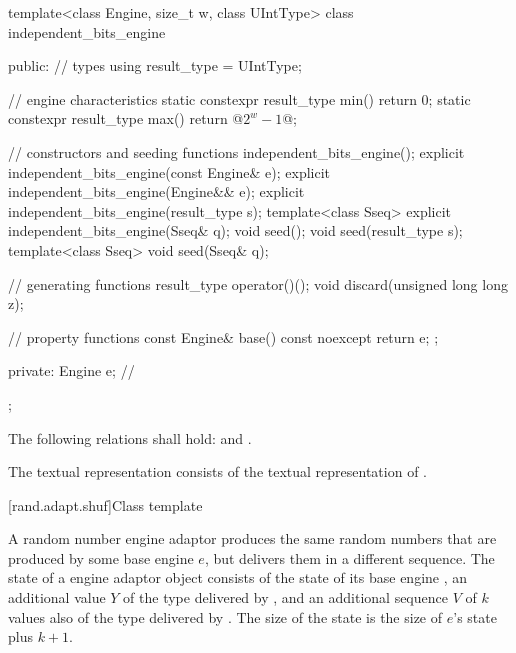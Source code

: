 \begin{codeblock}
template<class Engine, size_t w, class UIntType>
class independent_bits_engine
{
public:
 // types
 using result_type = UIntType;

 // engine characteristics
 static constexpr result_type min() { return 0; }
 static constexpr result_type max() { return @$2^w - 1$@; }

 // constructors and seeding functions
 independent_bits_engine();
 explicit independent_bits_engine(const Engine& e);
 explicit independent_bits_engine(Engine&& e);
 explicit independent_bits_engine(result_type s);
 template<class Sseq> explicit independent_bits_engine(Sseq& q);
 void seed();
 void seed(result_type s);
 template<class Sseq> void seed(Sseq& q);

 // generating functions
 result_type operator()();
 void discard(unsigned long long z);

 // property functions
 const Engine& base() const noexcept { return e; };

private:
 Engine e;   // \expos
};
\end{codeblock}%

\pnum
The following relations shall hold:
and
  .

\pnum
The textual representation%
%
consists of
 the textual representation of .



[rand.adapt.shuf]{Class template }%
%

\pnum
A  random number engine adaptor
produces the same random numbers
that are produced by some base engine $e$,
but delivers them in a different sequence.
The state%
%
of a  engine adaptor object 
consists of
 the state  of its base engine ,
 an additional value $Y$ of the type delivered by ,
and
 an additional sequence $V$ of $k$ values
 also of the type delivered by .
The size of the state is
 the size of $e$'s state plus $k+1$.

